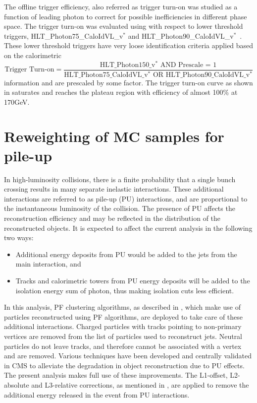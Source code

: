 The offline trigger efficiency, also referred as trigger turn-on was studied as a function of leading photon \pt to correct for possible 
inefficiencies in different phase space. The trigger turn-on was evaluated using \eqn{\ref{Eq:triggerTurnOn}} with respect to lower 
threshold triggers, HLT\_Photon75\_CaloIdVL\_v$^\ast$ and HLT\_Photon90\_CaloIdVL\_v$^\ast$~\cite{Chatrchyan:2008aa,triggerTDR,daqhltTDR}. 
These lower threshold triggers have very loose identification criteria applied based on the calorimetric
\begin{equation}
\text{Trigger Turn-on} = \frac{\text{HLT\_Photon150\_v$^\ast$ AND Prescale = 1}}{\text{HLT\_Photon75\_CaloIdVL\_v$^\ast$ OR HLT\_Photon90\_CaloIdVL\_v$^\ast$}}
\label{Eq:triggerTurnOn}
\end{equation}
information and are prescaled by 
some factor. The trigger turn-on curve as shown in \fig{\ref{fig:HLT150}} saturates and reaches the plateau region with efficiency of almost 
100\% at 170\unit{GeV}.

\section{Reweighting of MC samples for pile-up}
In high-luminosity collisions, there is a finite probability that a single bunch crossing results in many separate inelastic interactions. These
 additional interactions are referred to as pile-up (\gls{PU}) interactions, and are proportional to the instantaneous luminosity of the collision. The 
presence of PU affects the reconstruction efficiency and may be reflected in the \pt distribution of the reconstructed objects. It 
is expected to affect the current analysis in the following two ways:
\begin{itemize}
\item Additional energy deposits from PU would be added to the jets from the main interaction, and
\item Tracks and calorimetric towers from PU energy deposits will be added to the isolation energy sum of photon, thus making isolation cuts less
 efficient.
\end{itemize}
In this analysis, \gls{PF} clustering algorithms, as described in \sectn{\ref{Se:PFAlgo}}, which make use of particles reconstructed using PF 
algorithms, are deployed to take care of these additional interactions. Charged particles with tracks pointing to non-primary vertices are removed 
from the list of particles used to reconstruct jets. Neutral particles do not leave tracks, and therefore cannot be associated with a vertex and are 
removed. Various techniques have been developed and centrally validated in CMS to alleviate the degradation in object reconstruction due to PU effects. 
The present analysis makes full use of these improvements. The L1-offset, L2-absolute and L3-relative corrections, as mentioned in \sectn{\ref{Se:Jec}},
are applied to remove the additional energy released in the event from PU interactions.

